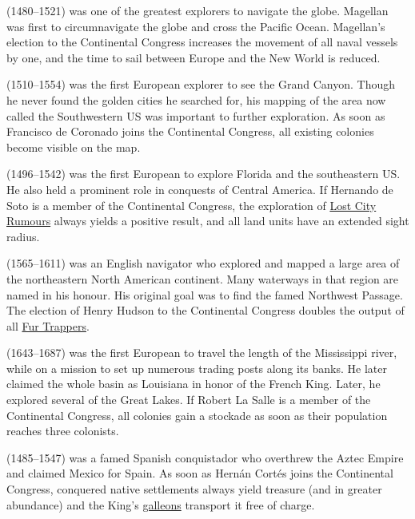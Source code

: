 \documentclass[12pt]{book}
\begin{document}
 (1480--1521) was one of the greatest
explorers to navigate the globe. Magellan was first to circumnavigate
the globe and cross the Pacific Ocean. Magellan's election to the
Continental Congress increases the movement of all naval vessels by
one, and the time to sail between Europe and the New World is
reduced. 

(1510--1554) was the first European explorer to see the Grand
Canyon. Though he never found the golden cities he searched for, his
mapping of the area now called the Southwestern US was important to
further exploration. As soon as Francisco de Coronado joins the
Continental Congress, all existing colonies become visible on the
map. 

 (1496--1542) was the first European to
explore Florida and the southeastern US.  He also held a prominent
role in conquests of Central America. If Hernando de Soto is a member
of the Continental Congress, the exploration of \hyperlink{Lost City
Rumours}{Lost City Rumours} always yields a positive result, and all land
units have an extended sight radius. 

 (1565--1611) was an English navigator who
explored and mapped a large area of the northeastern North American
continent.  Many waterways in that region are named in his honour. His
original goal was to find the famed Northwest Passage. The election of
Henry Hudson to the Continental Congress doubles the output of all
\hyperlink{Expert Fur Trapper}{Fur Trappers}. 

 (1643--1687) was the first European to travel
the length of the Mississippi river, while on a mission to set up
numerous trading posts along its banks.  He later claimed the whole
basin as Louisiana in honor of the French King. Later, he explored
several of the Great Lakes. If Robert La Salle is a member of the
Continental Congress, all colonies gain a stockade as soon as their
population reaches three colonists. 

 (1485--1547) was a famed Spanish
conquistador who overthrew the Aztec Empire and claimed Mexico for
Spain. As soon as Hern\'an Cort\'es joins the Continental Congress,
conquered native settlements always yield treasure (and in greater
abundance) and the King's \hyperlink{Galleon}{galleons} transport it
free of charge. 
\end{document}
